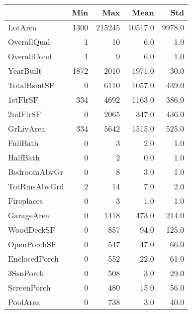 \begin{tabular}{lrrrr}
\toprule
{} &   Min &     Max &     Mean &     Std \\
\midrule
LotArea       &  1300 &  215245 &  10517.0 &  9978.0 \\
OverallQual   &     1 &      10 &      6.0 &     1.0 \\
OverallCond   &     1 &       9 &      6.0 &     1.0 \\
YearBuilt     &  1872 &    2010 &   1971.0 &    30.0 \\
TotalBsmtSF   &     0 &    6110 &   1057.0 &   439.0 \\
1stFlrSF      &   334 &    4692 &   1163.0 &   386.0 \\
2ndFlrSF      &     0 &    2065 &    347.0 &   436.0 \\
GrLivArea     &   334 &    5642 &   1515.0 &   525.0 \\
FullBath      &     0 &       3 &      2.0 &     1.0 \\
HalfBath      &     0 &       2 &      0.0 &     1.0 \\
BedroomAbvGr  &     0 &       8 &      3.0 &     1.0 \\
TotRmsAbvGrd  &     2 &      14 &      7.0 &     2.0 \\
Fireplaces    &     0 &       3 &      1.0 &     1.0 \\
GarageArea    &     0 &    1418 &    473.0 &   214.0 \\
WoodDeckSF    &     0 &     857 &     94.0 &   125.0 \\
OpenPorchSF   &     0 &     547 &     47.0 &    66.0 \\
EnclosedPorch &     0 &     552 &     22.0 &    61.0 \\
3SsnPorch     &     0 &     508 &      3.0 &    29.0 \\
ScreenPorch   &     0 &     480 &     15.0 &    56.0 \\
PoolArea      &     0 &     738 &      3.0 &    40.0 \\
\bottomrule
\end{tabular}

